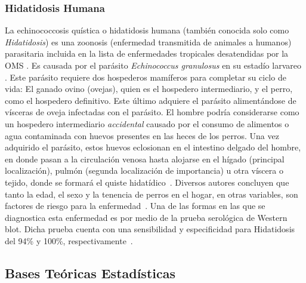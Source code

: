\subsubsection{Hidatidosis Humana}\label{hidat}
La echinococcosis quística o hidatidosis humana (también conocida solo como \textit{Hidatidosis}) es una zoonosis (enfermedad transmitida de animales a humanos) parasitaria incluida en la lista de enfermedades tropicales desatendidas por la OMS \cite{sarkar2017cystic}. Es causada por el parásito \textit{Echinococcus granulosus} en su estadío larvareo \cite{giri2012review}. Este parásito requiere dos hospederos mamíferos para completar su ciclo de vida: El ganado ovino (ovejas), quien es el hospedero intermediario, y el perro, como el hospedero definitivo. Este último adquiere el parásito alimentándose de vísceras de oveja infectadas con el parásito. El hombre podría considerarse como un hospedero intermediario \textit{accidental} causado por el consumo de alimentos o agua contaminada con huevos presentes en las heces de los perros. Una vez adquirido el parásito, estos huevos eclosionan en el intestino delgado del hombre, en donde pasan a la circulación venosa hasta alojarse en el hígado (principal localización), pulmón (segunda localización de importancia) u otra víscera o tejido, donde se formará el quiste hidatídico~\cite{moro2009echinococcosis}. Diversos autores concluyen que tanto la edad, el sexo y la tenencia de perros en el hogar, en otras variables, son factores de riesgo para la enfermedad~\cite{santivanez2010factores}. Una de las formas en las que se diagnostica esta enfermedad es por medio de la prueba serológica de Western blot. Dicha prueba cuenta con una sensibilidad y especificidad para Hidatidosis del 94\% y 100\%, respectivamente~\cite{davelois2016rendimiento}. 
\newpage
\subsection{Bases Teóricas Estadísticas}
